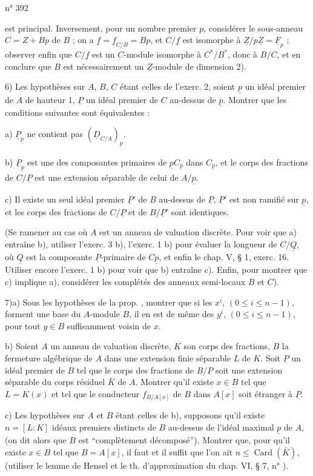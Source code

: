 \hfill n° 392

est principal. Inversement, pour un nombre premier $p$, considérer le sous-anneau $C=Z+Bp$ de $B$ ; on a $\underline f=\underline f_{C/B}=Bp$, et $C/\underline f$ est isomorphe à $\underline Z/p\underline Z=\underline F_p$ ; observer enfin que $C/\underline f$ est un $C$-module isomorphe à $C^*/B^*$, donc à $B/C$, et en conclure que $B$ est nécessairement un $\underline Z$-module de dimension 2).

6) Les hypothèses sur $A$, $B$, $C$ étant celles de l'exerc. 2, soient $\underline p$ un idéal premier de $A$ de hauteur 1, $\underline P$ un idéal premier de $C$ au-dessus de $\underline p$. Montrer que les conditions suivantes sont équivalentes :

a) $\underline P_{\underline p}$ ne contient pas $(\underline D_{C/A})_{\underline p}$.

b) $\underline P_{\underline p}$ est une des composantes primaires de $\underline p C_{\underline p}$ dans $C_{\underline p}$, et le corps des fractions de $C/\underline P$ est une extension séparable de celui de $A/\underline p$.

c) Il existe un seul idéal premier $\underline P'$ de $B$ au-dessus de $\underline P$, $\underline P'$ est non ramifié sur $\underline p$, et les corps des fractions de $C/\underline P$ et de $B/\underline P'$ sont identiques.

(Se ramener au cas où $A$ est un anneau de valuation discrète. Pour voir que a) entraîne b), utiliser l'exerc. 3 b), l'exerc. 1 b) pour évaluer la longueur de $C/\underline Q$, où $\underline Q$ est la composante $\underline P$-primaire de $C\underline p$, et enfin le chap. V, \S{} 1, exerc. 16. Utiliser encore l'exerc. 1 b) pour voir que b) entraîne c). Enfin, pour montrer que c) implique a), considérer les complétés des anneaux semi-locaux $B$ et $C$).

7)\quad a) Sous les hypothèses de la prop. \quad, montrer que si les $x^i$, $(0\leq i\leq n-1)$, forment une base du $A$-module $B$, il en est de même des $y^i$, $(0\leq i\leq n-1)$, pour tout $y\in B$ suffisamment voisin de $x$.

b) Soient $A$ un anneau de valuation discrète, $K$ son corps des fractions, $B$ la fermeture algébrique de $A$ dans une extension finie séparable $L$ de $K$. Soit $\underline P$ un idéal premier de $B$ tel que le corps des fractions de $B/\underline P$ soit une extension séparable du corps résiduel $\bar K$ de $A$. Montrer qu'il existe $x\in B$ tel que $L=K(x)$ et tel que le conducteur $f_{B/A[x]}$ de $B$ dans $A[x]$ soit étranger à $\underline P$.

c) Les hypothèses sur $A$ et $B$ étant celles de b), supposons qu'il existe $n=[L:K]$ idéaux premiers distincts de $B$ au-dessus de l'idéal maximal $\underline p$ de $A$, (on dit alors que $B$ est ``complètement décomposé''). Montrer que, pour qu'il existe $x\in B$ tel que $B=A[x]$, il faut et il suffit que l'on ait $n\leq\operatorname{Card}(\bar K)$, (utiliser le lemme de Hensel et le th. d'approximation du chap. VI, \S{} 7, n° \quad).
